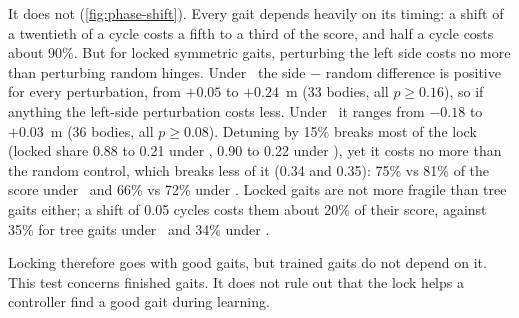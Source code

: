 It does not (\cref{fig:phase-shift}). Every gait depends heavily on its timing: a shift of a twentieth of a cycle costs a fifth to a third of the score, and half a cycle costs about 90\%. But for locked symmetric gaits, perturbing the left side costs no more than perturbing random hinges. Under \bb\ the side $-$ random difference is positive for every perturbation, from $+0.05$ to $+0.24$~m (33 bodies, all $p \geq 0.16$), so if anything the left-side perturbation costs less. Under \dann\ it ranges from $-0.18$ to $+0.03$~m (36 bodies, all $p \geq 0.08$). Detuning by 15\% breaks most of the lock (locked share 0.88 to 0.21 under \bb, 0.90 to 0.22 under \dann), yet it costs no more than the random control, which breaks less of it (0.34 and 0.35): 75\% vs 81\% of the score under \bb\ and 66\% vs 72\% under \dann. Locked gaits are not more fragile than tree gaits either; a shift of 0.05 cycles costs them about 20\% of their score, against 35\% for tree gaits under \bb\ and 34\% under \dann.

Locking therefore goes with good gaits, but trained gaits do not depend on it. This test concerns finished gaits. It does not rule out that the lock helps a controller find a good gait during learning.
